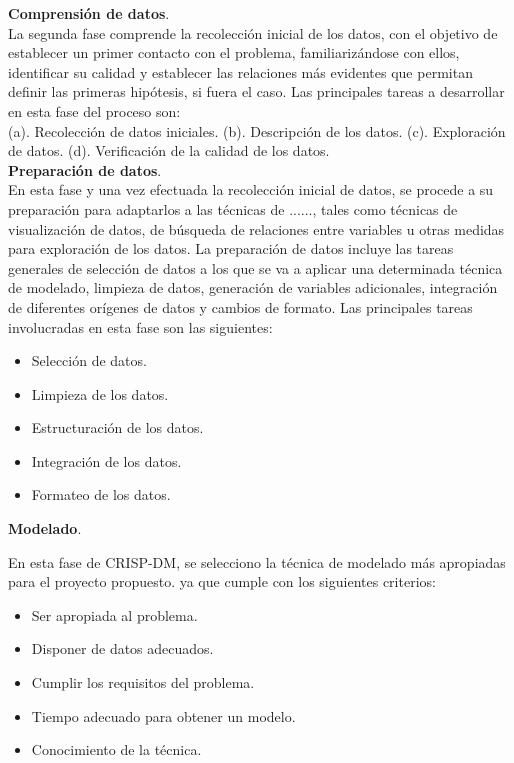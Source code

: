 \noindent
\textbf{Comprensión de datos}.\\

	La segunda fase comprende la recolección inicial de los  datos, con el objetivo de establecer un primer contacto con el problema, familiarizándose con ellos, identificar su calidad y establecer las relaciones más evidentes que permitan definir las primeras hipótesis, si fuera el caso. Las principales tareas a desarrollar en esta fase del proceso son:\\

(a).	Recolección de datos iniciales. 
(b).	Descripción de los datos.
(c).	Exploración de datos.
(d).	Verificación de la calidad de los datos.\\

\noindent
\textbf{Preparación de datos}.\\

En esta fase y una vez efectuada la recolección inicial de datos, se procede a su preparación para adaptarlos a las técnicas de  ......, tales como técnicas de visualización de datos, de búsqueda de relaciones entre variables u otras medidas para exploración de los datos. La preparación de datos incluye las tareas generales de selección de datos a los que se va a aplicar una determinada técnica de modelado, limpieza de datos, generación de variables adicionales, integración de diferentes orígenes de datos y cambios de formato. Las principales tareas involucradas en esta fase son las siguientes:\\

\begin{itemize}
\item	Selección de datos.
\item Limpieza de los datos.
\item	Estructuración de los datos.
\item	Integración de los datos.
\item	Formateo de los datos.\\
\end{itemize}

\noindent
\textbf{Modelado}.

En esta fase de CRISP-DM, se  selecciono la técnica  de modelado más apropiadas para el proyecto propuesto. ya que cumple con los siguientes criterios: 

\begin{itemize}
\item	Ser apropiada al problema. 
\item	Disponer de datos adecuados. 
\item	Cumplir los requisitos del problema. 
\item	Tiempo adecuado para obtener un modelo. 
\item	Conocimiento de la técnica.
\end{itemize}


